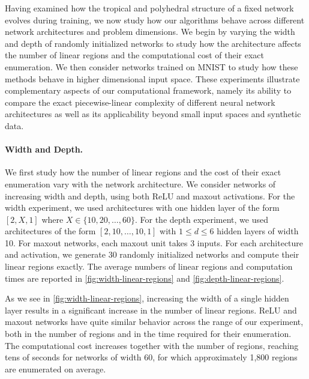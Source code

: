 \documentclass[10pt]{article}
\theoremstyle{definition}
\theoremstyle{remark}
\begin{document}
Having examined how the tropical and polyhedral structure of a fixed network evolves during training, we now study how our algorithms behave across different network architectures and problem dimensions. 
We begin by varying the width and depth of randomly initialized networks to study how the architecture affects the number of linear regions and the computational cost of their exact enumeration. We then consider networks trained on MNIST to study how these methods behave in higher dimensional input space. These experiments illustrate complementary aspects of our computational framework, namely its ability to compare the exact piecewise-linear complexity of different neural network architectures as well as its applicability beyond small input spaces and synthetic data.

\paragraph{Width and Depth.} We first study how the number of linear regions and the cost of their exact enumeration vary with the network architecture. We consider networks of increasing width and depth, using both ReLU and maxout activations. For the width experiment, we used architectures with one hidden layer of the form $[2, X, 1]$ where $X \in \{10, 20, \ldots, 60\}$. For the depth experiment, we used architectures of the form $[2, 10, \dotsc, 10, 1]$ with $1 \le d \le 6$ hidden layers of width 10. For maxout networks, each maxout unit takes 3 inputs. For each architecture and activation, we generate 30 randomly initialized networks and compute their linear regions exactly. The average numbers of linear regions and computation times are reported in \cref{fig:width-linear-regions} and \cref{fig:depth-linear-regions}.

\newcommand{\plotwidthdepthseries}[6]{%
    \addplot[#1, filter discard warning=false,
        error bars/.cd,
            y dir=both,
            y explicit,
        /pgfplots/.cd,
        x filter/.code={%
            \ifnum\pdfstrcmp{\thisrow{Network}}{#5}=0\relax
                \ifnum\pdfstrcmp{\thisrow{Sweep}}{#6}=0\relax
                \else
                    \def\pgfmathresult{}%
                \fi
            \else
                \def\pgfmathresult{}%
            \fi
        }
    ] table [x=#2, y=#3, y error=#4, col sep=comma] {data/width-depth-linear-regions/linear_regions.csv};%
}

As we see in \cref{fig:width-linear-regions}, increasing the width of a single hidden layer results in a significant increase in the number of linear regions. ReLU and maxout networks have quite similar behavior across the range of our experiment, both in the number of regions and in the time required for their enumeration. The computational cost increases together with the number of regions, reaching tens of seconds for networks of width 60, for which approximately 1,800 regions are enumerated on average.
\end{document}
